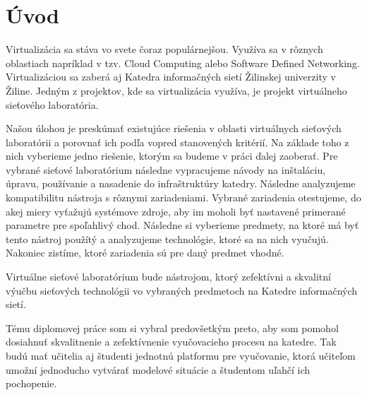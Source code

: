 \chapter*{Úvod}

Virtualizácia sa stáva vo svete čoraz populárnejšou. Využíva sa v rôznych oblastiach napríklad v tzv. Cloud Computing alebo Software Defined Networking. Virtualizáciou sa zaberá aj Katedra informačných sietí Žilinskej univerzity v Žiline. Jedným z projektov, kde sa virtualizácia využíva, je projekt virtuálneho sieťového laboratória. 

Našou úlohou je preskúmať existujúce riešenia v oblasti virtuálnych sieťových laboratórii a porovnať ich podľa vopred stanovených kritérií. Na základe toho z nich vyberieme jedno riešenie, ktorým sa budeme v práci ďalej zaoberať. Pre vybrané sieťové laboratórium následne vypracujeme návody na inštaláciu, úpravu, používanie a nasadenie do infraštruktúry katedry. Následne analyzujeme kompatibilitu nástroja s rôznymi zariadeniami. Vybrané zariadenia otestujeme, do akej miery vyťažujú systémove zdroje, aby im moholi byť nastavené primerané parametre pre spoľahlivý chod. Následne si vyberieme predmety, na ktoré má byť tento nástroj použítý a analyzujeme technológie, ktoré sa na nich vyučujú. Nakoniec zistíme, ktoré zariadenia sú pre daný predmet vhodné.

Virtuálne sieťové laboratórium bude nástrojom, ktorý zefektívni a skvalitní výučbu sieťových technológii vo vybraných predmetoch na Katedre informačných sietí.

Tému diplomovej práce som si vybral predovšetkým preto, aby som pomohol dosiahnuť skvalitnenie a zefektívnenie vyučovacieho procesu na katedre. Tak budú mať učitelia aj študenti jednotnú platformu pre vyučovanie, ktorá učiteľom umožní jednoducho vytvárať modelové situácie a študentom uľahčí ich pochopenie.
